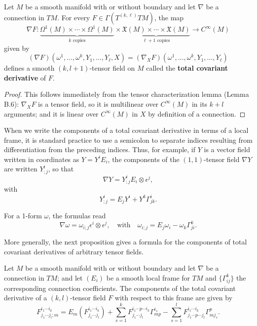 \begin{proposition}
\label{prop:total-covariant-derivative}
Let $M$ be a smooth manifold with or without boundary and let $\nabla$ be a connection in $TM$. For every $F \in \Gamma(T^{(k,\ell)}TM)$, the map
\[
\nabla F: \underbrace{\Omega^1(M) \times \cdots \times \Omega^1(M)}_{k \text{ copies}} \times \underbrace{\mathfrak{X}(M) \times \cdots \times \mathfrak{X}(M)}_{\ell+1 \text{ copies}} \to C^\infty(M)
\]
given by
\begin{equation}
(\nabla F)(\omega^1, \ldots, \omega^k, Y_1, \ldots, Y_\ell, X) = (\nabla_X F)(\omega^1, \ldots, \omega^k, Y_1, \ldots, Y_\ell) \tag{4.14}
\end{equation}
defines a smooth $(k,l+1)$-tensor field on $M$ called the \textbf{total covariant derivative} of $F$.
\end{proposition}

\begin{proof}
This follows immediately from the tensor characterization lemma (Lemma B.6): $\nabla_X F$ is a tensor field, so it is multilinear over $C^\infty(M)$ in its $k+l$ arguments; and it is linear over $C^\infty(M)$ in $X$ by definition of a connection.
\end{proof}

When we write the components of a total covariant derivative in terms of a local frame, it is standard practice to use a semicolon to separate indices resulting from differentiation from the preceding indices. Thus, for example, if $Y$ is a vector field written in coordinates as $Y = Y^i E_i$, the components of the $(1,1)$-tensor field $\nabla Y$ are written $Y^i_{;j}$, so that
\[
\nabla Y = Y^i_{;j} E_i \otimes \epsilon^j,
\]
with
\[
Y^i_{;j} = E_j Y^i + Y^k \Gamma^i_{jk}.
\]

For a 1-form $\omega$, the formulas read
\[
\nabla \omega = \omega_{i;j} \epsilon^i \otimes \epsilon^j, \quad \text{with} \quad \omega_{i;j} = E_j \omega_i - \omega_k \Gamma^k_{ji}.
\]

More generally, the next proposition gives a formula for the components of total covariant derivatives of arbitrary tensor fields.

\begin{proposition}
\label{prop:total-covariant-derivative-components}
Let $M$ be a smooth manifold with or without boundary and let $\nabla$ be a connection in $TM$; and let $(E_i)$ be a smooth local frame for $TM$ and $\{\Gamma^k_{ij}\}$ the corresponding connection coefficients. The components of the total covariant derivative of a $(k,l)$-tensor field $F$ with respect to this frame are given by
\[
F^{i_1\cdots i_k}_{j_1\cdots j_l;m} = E_m\left(F^{i_1\cdots i_k}_{j_1\cdots j_l}\right) + \sum_{s=1}^k F^{i_1\cdots p \cdots i_k}_{j_1\cdots j_l} \Gamma^{i_s}_{mp} - \sum_{s=1}^l F^{i_1\cdots i_k}_{j_1\cdots p \cdots j_l} \Gamma^p_{mj_s}.
\]
\end{proposition}

